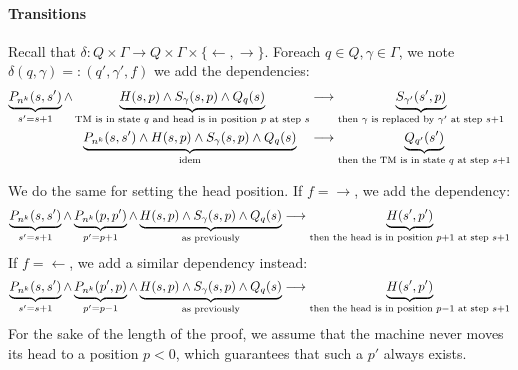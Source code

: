 \documentclass{../../cs-classes/cs-classes}
\begin{document}
\begin{exercise}
    \paragraph*{Transitions}
    Recall that $\delta:Q\times\Gamma \to Q\times\Gamma\times\{\leftarrow, \rightarrow\}$. Foreach $q\in Q, \gamma\in\Gamma$, we note $\delta(q, \gamma) =: (q', \gamma', f)$ we add the dependencies:
    \begin{equation*}
        \begin{aligned}
            \underbrace{P_{n^k}(s, s')}_{s' = s+1} \land \underbrace{H(s, p) \land S_\gamma(s, p) \land Q_q(s)}_{\textnormal{TM is in state }q \textnormal{ and head is in position } p \textnormal{ at step }s} & \longrightarrow \underbrace{S_{\gamma'}(s', p)}_{\textnormal{then }\gamma \textnormal{ is replaced by }\gamma' \textnormal{ at step }s+1} \\
            \underbrace{P_{n^k}(s, s') \land H(s, p) \land S_\gamma(s, p) \land Q_q(s)}_{\textnormal{idem}} \quad                                                                                                & \longrightarrow \underbrace{Q_{q'}(s')}_{\textnormal{then the TM is in state }q\textnormal{ at step }s+1}
        \end{aligned}
    \end{equation*}

    We do the same for setting the head position. If $f=\rightarrow$, we add the dependency:
    \begin{equation*}
        \underbrace{P_{n^k}(s, s')}_{s' = s+1} \land \underbrace{P_{n^k}(p, p')}_{p' = p+1} \land \underbrace{H(s, p) \land S_\gamma(s, p) \land Q_q(s)}_{\textnormal{as previously}} \longrightarrow \underbrace{H(s', p')}_{\textnormal{then the head is in position } p+1 \textnormal{ at step }s+1}
    \end{equation*}
    If $f=\leftarrow$, we add a similar dependency instead:
    \begin{equation*}
        \underbrace{P_{n^k}(s, s')}_{s' = s+1} \land \underbrace{P_{n^k}(p', p)}_{p' = p-1} \land \underbrace{H(s, p) \land S_\gamma(s, p) \land Q_q(s)}_{\textnormal{as previously}}
        \longrightarrow \underbrace{H(s', p')}_{\textnormal{then the head is in position } p-1 \textnormal{ at step }s+1}
    \end{equation*}
    For the sake of the length of the proof, we assume that the machine never moves its head to a position $p<0$, which guarantees that such a $p'$ always exists.


\end{exercise}
\end{document}
